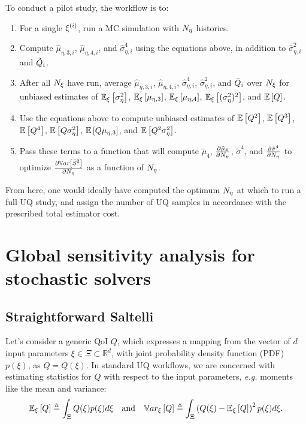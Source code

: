 To conduct a pilot study, the workflow is to:
\begin{enumerate}
    \item For a single $\xi^{(i)}$, run a MC simulation with ${N_\eta}$ histories.
    \item Compute $\hat{\mu}_{\eta,3,i}$, $\hat{\mu}_{\eta,4,i}$, and $\hat{\sigma}_{\eta,i}^4$ using the equations above, in addition to $\hat{\sigma}_{\eta,i}^2$ and $\tilde{Q}_i$.
    \item After all ${N_\xi}$ have run, average $\hat{\mu}_{\eta,3,i}$, $\hat{\mu}_{\eta,4,i}$, $\hat{\sigma}_{\eta,i}^4$, $\hat{\sigma}_{\eta,i}^2$, and $\tilde{Q}_i$ over ${N_\xi}$ for unbiased estimates of $\mathbb{E}_\xi\left[\sigma^2_\eta\right]$, $\mathbb{E}_\xi\left[\mu_{\eta,3}\right]$, $\mathbb{E}_\xi\left[\mu_{\eta,4}\right]$, $\mathbb{E}_\xi\left[(\sigma^2_\eta)^2\right]$, and $\mathbb{E}\left[Q\right]$.
    \item Use the equations above to compute unbiased estimates of $\mathbb{E}\left[Q^2\right]$, $\mathbb{E}\left[Q^3\right]$, $\mathbb{E}\left[Q^4\right]$, $\mathbb{E}\left[Q\sigma^2_\eta\right]$, $\mathbb{E}\left[Q\mu_{\eta,3}\right]$, and $\mathbb{E}\left[Q^2\sigma^2_\eta\right]$.
    \item Pass these terms to a function that will compute $\tilde{\mu}_4$, $\frac{ \partial  \tilde{\mu}_4  }{ \partial  {N_\eta}  }$, $\tilde{\sigma}^4$, and $\frac{ \partial \tilde{\sigma}^4 }{ \partial {N_\eta} }$ to optimize $\frac{ \partial  \mathbb{V}ar\left[\tilde{S}^2\right]  }{ \partial  {N_\eta}  }$ as a function of ${N_\eta}$.
\end{enumerate}
From here, one would ideally have computed the optimum ${N_\eta}$ at which to run a full UQ study, and assign the number of UQ samples in accordance with the prescribed total estimator cost. 



\section{Global sensitivity analysis for stochastic solvers}
\subsection{Straightforward Saltelli}
Let's consider a generic QoI $Q$, which expresses a mapping from the vector of $d$ input parameters $\xi \in \Xi \subset \mathbb{R}^d$, with joint probability density function (PDF) $p(\xi)$, as $Q = Q(\xi)$. In standard UQ workflows, we are concerned with estimating statistics for $Q$ with respect to the input parameters, \textit{e.g.} moments like the mean and variance:
\begin{equation}
\label{eq:UQmoments}
 \mathbb{E}_\xi\left[Q\right] \triangleq \int_\Xi Q(\xi) p(\xi) d\xi \quad \mathrm{and} \quad 
 \mathbb{V}ar_\xi\left[Q\right] \triangleq \int_\Xi \left( Q(\xi) - \mathbb{E}_\xi\left[Q\right] \right)^2 p(\xi) d\xi.
\end{equation}

